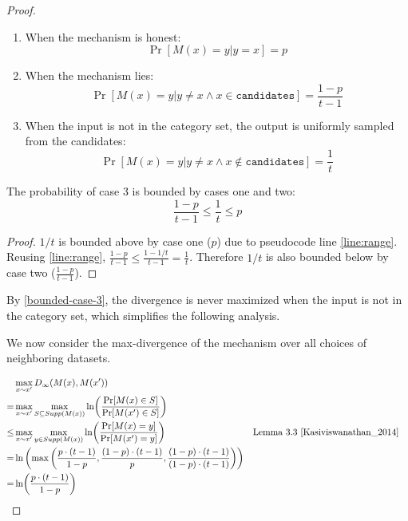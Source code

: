 \documentclass{article}
\begin{document}
\begin{proof}
\begin{enumerate}
    \item When the mechanism is honest: 
    \[
        \Pr[M(x) = y | y = x] = p
    \]

    \item When the mechanism lies: 
    \[
        \Pr[M(x) = y | y \ne x \wedge x \in \texttt{candidates}] = \frac{1 - p}{t - 1}
    \]

    \item When the input is not in the category set, the output is uniformly sampled from the candidates: 
    \[
        \Pr[M(x) = y | y \ne x \wedge x \not\in \texttt{candidates}] = \frac{1}{t}
    \]
\end{enumerate}

\begin{tcolorbox}
\begin{lemma}
    \label{bounded-case-3}
    The probability of case 3 is bounded by cases one and two:
     \begin{equation}
        \frac{1 - p}{t - 1} \leq \frac{1}{t} \leq p
     \end{equation}
\end{lemma}

\begin{proof}
$1 / t$ is bounded above by case one ($p$) due to pseudocode line \ref{line:range}. 
Reusing \ref{line:range}, $\frac{1 - p}{t - 1} \leq \frac{1 - 1/t}{t - 1} = \frac{1}{t}$.
Therefore $1 / t$ is also bounded below by case two ($\frac{1 - p}{t - 1}$).
\end{proof}
\end{tcolorbox}

By \ref{bounded-case-3}, the divergence is never maximized when the input is not in the category set,
which simplifies the following analysis.

We now consider the max-divergence of the mechanism over all choices of neighboring datasets.
    
\begin{align}
    &\max_{x \sim x'} D_{\infty}(M(x), M(x')) \\
    =& \max_{x \sim x'} \max_{S \subseteq Supp(M(x))}\ln (\frac{\Pr[M(x) \in S]}{\Pr[M(x') \in S]}) \\
    \le& \max_{x \sim x'} \max_{y \in Supp(M(x))}\ln (\frac{\Pr[M(x) = y]}{\Pr[M(x') = y]}) &&\text{Lemma 3.3 } \cite{Kasiviswanathan_2014} \\
    =& \ln \left(\max\left(\frac{p \cdot (t - 1)}{1 - p}, \frac{(1 - p) \cdot (t - 1)}{p}, \frac{(1 - p) \cdot (t - 1)}{(1 - p) \cdot (t - 1)}\right)\right) \label{max-terms} \\
    =& \ln (\frac{p \cdot (t - 1)}{1 - p})
\end{align}


\end{proof}
\end{document}
